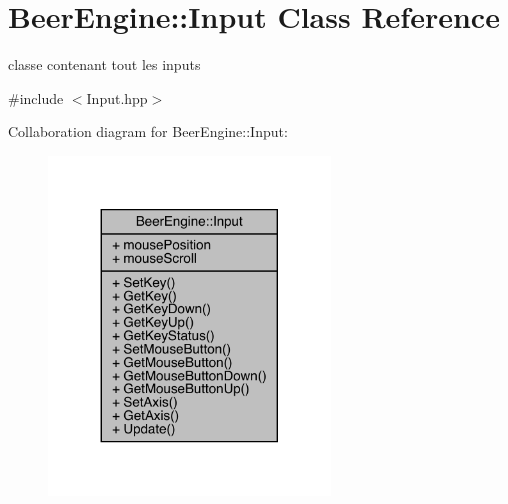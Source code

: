 \hypertarget{class_beer_engine_1_1_input}{}\section{Beer\+Engine\+:\+:Input Class Reference}
\label{class_beer_engine_1_1_input}


classe contenant tout les inputs  




{\ttfamily \#include $<$Input.\+hpp$>$}



Collaboration diagram for Beer\+Engine\+:\+:Input\+:\nopagebreak
\begin{figure}[H]
\begin{center}
\leavevmode
\includegraphics[width=212pt]{class_beer_engine_1_1_input__coll__graph}
\end{center}
\end{figure}
